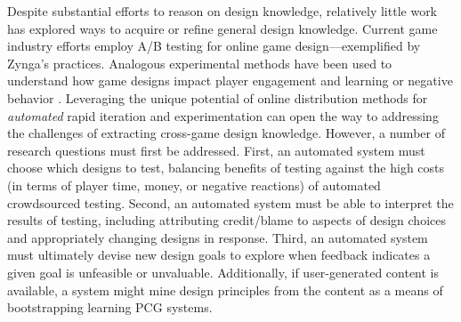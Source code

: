 \documentclass[conference]{IEEEtran}
\begin{document}
Despite substantial efforts to reason on design knowledge, relatively little work has explored ways to acquire or refine general design knowledge. 
Current game industry efforts employ A/B testing for online game design---exemplified by Zynga's practices.
Analogous experimental methods have been used to understand how game designs impact player engagement and learning \cite{lomas2013:opt-edugame-challenge} or negative behavior \cite{lin2013:toxic-behav}.
Leveraging the unique potential of online distribution methods for {\em automated} rapid iteration and experimentation can open the way to addressing the challenges of extracting cross-game design knowledge.
%
However, a number of research questions must first be addressed. 
First, an automated system must choose which designs to test, balancing benefits of testing against the high costs (in terms of player time, money, or negative reactions) of automated crowdsourced testing.
Second, an automated system must be able to interpret the results of testing, including attributing credit/blame to aspects of design choices and appropriately changing designs in response. 
Third, an automated system must ultimately devise new design goals to explore when feedback indicates a given goal is unfeasible or unvaluable.
%
Additionally, if user-generated content is available, a system might mine design principles from the content as a means of bootstrapping learning PCG systems.



\end{document}
